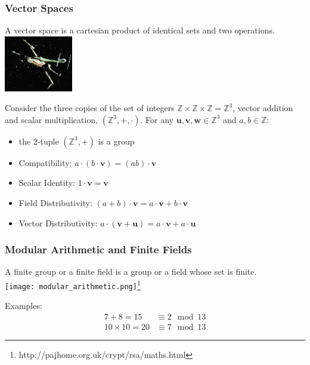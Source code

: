 \documentclass{beamer}
\begin{document}
\begin{frame}
\frametitle{Vector Spaces}
\begin{multicols}{2}
  A vector space is a cartesian product of identical sets and two operations. \\
  \columnbreak
  \includegraphics[width=3cm]{X-Wing_TIE.png}
\end{multicols}

Consider the three copies of the set of integers $\mathbb Z\times \mathbb Z\times \mathbb Z = \mathbb Z^3$, vector addition and scalar multiplication, $(\mathbb Z^3,+,\cdot)$.  For any $\pmb u,\pmb v,\pmb w \in \mathbb Z^3$ and $a,b \in \mathbb Z$:
\begin{itemize}
  \item the 2-tuple $(\mathbb Z^3,+)$ is a group
  \item Compatibility: $a\cdot(b\cdot\pmb v) = (ab)\cdot\pmb v$
  \item Scalar Identity: $1\cdot\pmb v = \pmb v$
  \item Field Distributivity: $(a + b)\cdot\pmb v = a\cdot\pmb v + b\cdot\pmb v$
  \item Vector Distributivity: $a\cdot(\pmb v + \pmb u) = a\cdot\pmb v + a\cdot \pmb u$
\end{itemize}
\end{frame}

\begin{frame}
\frametitle{Modular Arithmetic and Finite Fields}
\begin{multicols}{2}
  A finite group or a finite field is a group or a field whose set is finite. \\
  \columnbreak
  \texttt{[image: modular\_arithmetic.png]}\footnote{http://pajhome.org.uk/crypt/rsa/maths.html}
\end{multicols}
Examples:
\begin{align*}
  7 + 8 = 15 &\equiv 2 \mod 13 \\
  10\times10 = 20 &\equiv 7 \mod 13
\end{align*}
\end{frame}
\end{document}
